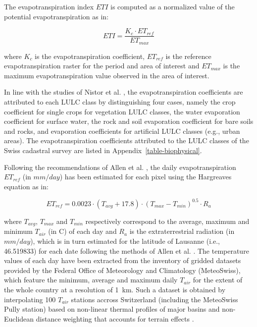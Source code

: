 \documentclass[10pt,letterpaper]{article}
\begin{document}
The evapotranspiration index $ETI$ is computed as a normalized value of the potential evapotranspiration as in:

\begin{equation}
  \label{eq:evapotranspiration-index}
  ETI = \frac{K_c \cdot ET_{ref}}{ET_{max}}
\end{equation}

where $K_c$ is the evapotranspiration coefficient, $ET_{ref}$ is the reference evapotranspiration raster for the period and area of interest and $ET_{max}$ is the maximum evapotranspiration value observed in the area of interest.


In line with the studies of Nistor et al. \cite{nistor2015compute,nistor2016climate,nistor2016mapping}, the evapotranspiration coefficients are attributed to each LULC class by distinguishing four cases, namely the crop coefficient for single crops for vegetation LULC classes, the water evaporation coefficient for surface water, the rock and soil evaporation coefficient for bare soils and rocks, and evaporation coefficients for artificial LULC classes (e.g., urban areas).
The evapotranspiration coefficients attributed to the LULC classes of the Swiss cadastral survey are listed in Appendix~\ref{table-biophysical}.


Following the recommendations of Allen et al. \cite{allen1998crop}, the daily evapotranspiration $ET_{ref}$ (in $mm/day$) has been estimated for each pixel using the Hargreaves equation \cite{hargreaves1985reference} as in:

\begin{equation}
  \label{eq:ref-evapotranspiration}
  ET_{ref} = 0.0023 \cdot (T_{avg} + 17.8) \cdot (T_{max} - T_{min})^{0.5} \cdot R_a
\end{equation}

where $T_{avg}$, $T_{max}$ and $T_{min}$ respectively correspond to the average, maximum and minimum $T_{air}$ (in \degree C) of each day and $R_a$ is the extraterrestrial radiation (in $mm/day$), which is in turn estimated for the latitude of Lausanne (i.e., 46.519833\degree) for each date following the methods of Allen et al. \cite[Equation 21]{allen1998crop}.
The temperature values of each day have been extracted from the inventory of gridded datasets provided by the Federal Office of Meteorology and Climatology (MeteoSwiss), which feature the minimum, average and maximum daily $T_{air}$ for the extent of the whole country at a resolution of 1~km. Such a dataset is obtained by interpolating 100 $T_{air}$ stations accross Switzerland (including the MeteoSwiss Pully station) based on non-linear thermal profiles of major basins and non-Euclidean distance weighting that accounts for terrain effects \cite{frei2014interpolation}.
\end{document}
